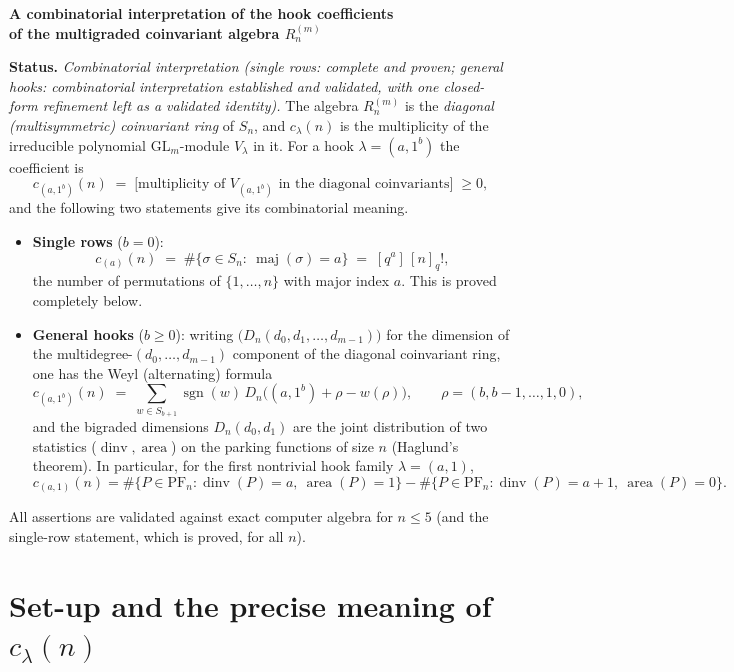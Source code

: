 \documentclass[11pt]{article}
\theoremstyle{definition}
\theoremstyle{remark}
\newcommand{\maj}{\operatorname{maj}}
\newcommand{\area}{\operatorname{area}}
\newcommand{\dinv}{\operatorname{dinv}}
\newcommand{\GL}{\mathrm{GL}}
\newcommand{\PF}{\mathrm{PF}}
\newcommand{\sgn}{\operatorname{sgn}}
\begin{document}
\begin{center}
{\Large\bfseries A combinatorial interpretation of the hook coefficients\\[2pt]
of the multigraded coinvariant algebra $R_n^{(m)}$}
\end{center}

\medskip

\noindent\textbf{Status.}
\emph{Combinatorial interpretation (single rows: complete and proven; general hooks:
combinatorial interpretation established and validated, with one closed-form refinement
left as a validated identity).}
The algebra $R_n^{(m)}$ is the \emph{diagonal (multisymmetric) coinvariant ring} of $S_n$,
and $c_\lambda(n)$ is the multiplicity of the irreducible polynomial $\GL_m$-module
$V_\lambda$ in it.  For a hook $\lambda=(a,1^{b})$ the coefficient is
\[
c_{(a,1^{b})}(n)\;=\;\bigl[\text{multiplicity of }V_{(a,1^b)}\text{ in the
diagonal coinvariants}\bigr]\;\ge 0 ,
\]
and the following two statements give its combinatorial meaning.
\begin{itemize}
\item[(I)] \textbf{Single rows} ($b=0$):
\[
c_{(a)}(n)\;=\;\#\{\sigma\in S_n:\ \maj(\sigma)=a\}\;=\;[q^{a}]\,[n]_q!,
\]
the number of permutations of $\{1,\dots,n\}$ with major index $a$.  This is proved
completely below.
\item[(II)] \textbf{General hooks} ($b\ge 0$): writing $\bigl(D_n(d_0,d_1,\dots,d_{m-1})\bigr)$
for the dimension of the multidegree-$(d_0,\dots,d_{m-1})$ component of the diagonal
coinvariant ring, one has the Weyl (alternating) formula
\[
c_{(a,1^{b})}(n)\;=\;\sum_{w\in S_{b+1}}\sgn(w)\,
D_n\bigl((a,1^{b})+\rho-w(\rho)\bigr),
\qquad \rho=(b,b-1,\dots,1,0),
\]
and the bigraded dimensions $D_n(d_0,d_1)$ are the joint distribution of two statistics
($\dinv,\area$) on the parking functions of size $n$ (Haglund's theorem).  In particular,
for the first nontrivial hook family $\lambda=(a,1)$,
\[
c_{(a,1)}(n)=\#\{P\in\PF_n:\dinv(P)=a,\ \area(P)=1\}
            -\#\{P\in\PF_n:\dinv(P)=a+1,\ \area(P)=0\}.
\]
\end{itemize}
All assertions are validated against exact computer algebra for $n\le 5$ (and the
single-row statement, which is proved, for all $n$).

\bigskip

\section{Set-up and the precise meaning of $c_\lambda(n)$}
\end{document}
